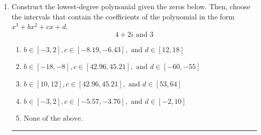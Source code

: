 \documentclass[14pt]{extbook}
\newcommand{\litem}[1]{\item#1\hspace*{-1cm}\rule{\textwidth}{0.4pt}}
\begin{document}
\begin{enumerate}
{\begin{enumerate}[label=\Alph*.]
\end{enumerate} }
\litem{
Construct the lowest-degree polynomial given the zeros below. Then, choose the intervals that contain the coefficients of the polynomial in the form $x^3+bx^2+cx+d$.\[ 4 + 2 i \text{ and } 3 \]\begin{enumerate}[label=\Alph*.]
\item \( b \in [-3, 2], c \in [-8.19, -6.43], \text{ and } d \in [12, 18] \)
\item \( b \in [-18, -8], c \in [42.96, 45.21], \text{ and } d \in [-60, -55] \)
\item \( b \in [10, 12], c \in [42.96, 45.21], \text{ and } d \in [53, 64] \)
\item \( b \in [-3, 2], c \in [-5.57, -3.76], \text{ and } d \in [-2, 10] \)
\item \( \text{None of the above.} \)


\end{enumerate}}
\end{enumerate}
\end{document}
